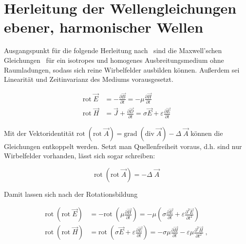 \chapter{Herleitung der Wellengleichungen ebener, harmonischer Wellen}\label{Anhang:Herleitung_Wellengleichung}

Ausgangspunkt für die folgende Herleitung nach~\cite{EM_Schirmung} sind die Maxwell'schen Gleichungen~\cite{Maxwell} für ein isotropes und homogenes Ausbreitungsmedium ohne Raumladungen, sodass sich reine Wirbelfelder ausbilden können. Außerdem sei Linearität und Zeitinvarianz des Mediums vorausgesetzt.

\begin{subequations}
    \begin{align}
        \text{rot} \; \vec E &= - \frac{\partial \vec B}{\partial t} = - \mu \frac{\partial  \vec H}{\partial t} \\
        \text{rot} \; \vec H &= \vec J + \frac{\partial  \vec D}{\partial t} = \sigma \vec E + \varepsilon \frac{\partial  \vec E}{\partial t}
    \end{align}
\end{subequations}

Mit der Vektoridentität $\text{rot} \; (\text{rot} \; \vec A) = \text{grad} \; (\text{div} \; \vec A) - \Delta \; \vec A$ \cite{Merzinger} können die Gleichungen entkoppelt werden. Setzt man Quellenfreiheit voraus, d.h. sind nur Wirbelfelder vorhanden, lässt sich sogar schreiben:

\begin{equation}
    \text{rot} \; (\text{rot} \; \vec A) = - \Delta \; \vec A
\end{equation}

Damit lassen sich nach der Rotationsbildung 

\begin{subequations}
    \begin{align}
        \text{rot} \; (\text{rot} \; \vec E) &= - \text{rot} \; (\mu \frac{\partial  \vec H}{\partial t}) = - \mu \left(\sigma \frac{\partial  \vec E}{\partial t} + \varepsilon \frac{\partial ^2\vec E}{\partial t^2}\right) \\
        \text{rot} \; (\text{rot} \; \vec H) &= \text{rot} \; (\sigma \vec E + \varepsilon \frac{\partial  \vec E}{\partial t}) = - \sigma \mu \frac{\partial \vec H}{\partial t} - \varepsilon \mu \frac{\partial ^2 \vec H}{\partial t^2} \; ,
    \end{align}
\end{subequations}

